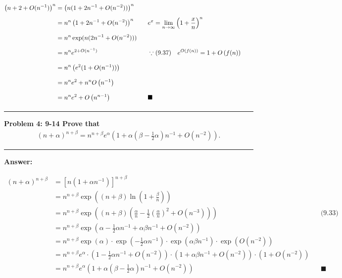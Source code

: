 \documentclass[11pt,fleqn]{article}
\newcommand\question[2]{\vspace{.25in}\hrule\textbf{#1: #2}\vspace{.5em}\hrule\vspace{.10in}}
\renewcommand\part[1]{\vspace{.10in}\textbf{#1}}
\begin{document}
\begin{align*}
	\left(n + 2 + O(n^{-1})\right)^n 
		&= \left(n(1 + 2n^{-1} + O(n^{-2}))\right)^n \phantom{1\over1}\\
		&= n^n \left(1 + 2n^{-1} + O(n^{-2})\right)^n 
			&& e^x = \lim_{n \rightarrow \infty} \left(1 + \frac{x}{n}\right)^n 
			\phantom{1\over1} \\
		&= n^n \exp(n (2n^{-1} + O(n^{-2}))) \phantom{1\over1} \\
		&= n^n e^{2 + O(n^{-1})} 
			&& \because \text{(9.37)} \quad e^{O\left(f(n)\right)} = 1 + O\left(f(n)\right)
			\phantom{1\over1} \\
		&= n^n \left(e^2 (1 + O(n^{-1}))\right) \phantom{1\over1} \\
		&= n^n e^2 + n^n O\left(n^{-1}\right) \phantom{1\over1} \\
		&= n^n e^2 + O\left(n^{n-1}\right) \phantom{1\over1}
			&& \blacksquare
\end{align*}

\question{Problem 4} {9-14 Prove that
	\begin{align*}
		(n+\alpha)^{n+\beta} 
			= n^{n+\beta} e^{\alpha}\left(1 + \alpha(\beta-\frac{1}{2}\alpha)n^{-1} 
				+ O(n^{-2}) \right).
	\end{align*}
}

\part{Answer:}

\begin{align*}
	(n+\alpha)^{n+\beta} &= \left[n(1+\alpha n^{-1})\right]^{n+\beta} \\
		&= n^{n+\beta} \exp((n+\beta) \ln(1+\frac{\beta}{n})) \\
		&= n^{n+\beta} \exp((n+\beta) (\frac{\alpha}{n} 
			- \frac{1}{2} \left(\frac{\alpha}{n}\right)^2 + O(n^{-3}))) 
			&& \text{(9.33)}\\
		&= n^{n+\beta} \exp(\alpha-\frac{1}{2}\alpha n^{-1} 
			+ \alpha\beta n^{-1} + O(n^{-2})) \\
		&= n^{n+\beta} \exp(\alpha) \cdot \exp(-\frac{1}{2}\alpha n^{-1}) 
			\cdot \exp(\alpha\beta n^{-1}) \cdot \exp(O(n^{-2})) \\
		&= n^{n+\beta} e^{\alpha} \cdot
			\left(1 - \frac{1}{2}\alpha n^{-1} + O(n^{-2})\right) \cdot
			\left(1 + \alpha\beta n^{-1} + O(n^{-2})\right) \cdot
			\left(1 + O(n^{-2})\right) \\
		&= n^{n+\beta} e^{\alpha} \left(1 + \alpha(\beta-\frac{1}{2}\alpha)n^{-1} 
				+ O(n^{-2}) \right) && \blacksquare
\end{align*}
\end{document}
